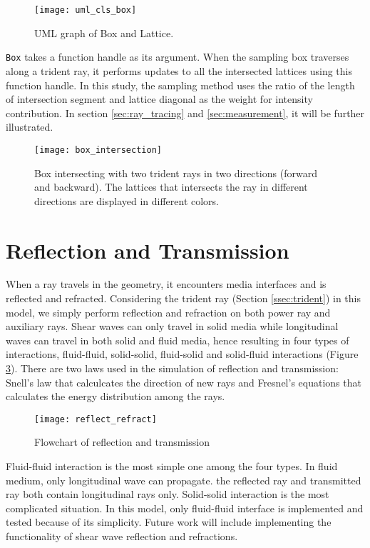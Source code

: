 \begin{figure}[h]
    \centering
    \texttt{[image: uml\_cls\_box]}
    \caption{UML graph of Box and Lattice.}
    \label{fig:uml_cls_box}
\end{figure}

\texttt{Box} takes a function handle as its argument. When the sampling box traverses along a trident ray,  it performs updates to all the intersected lattices using this function handle. In this study, the sampling method uses the ratio of the length of intersection segment and lattice diagonal as the weight for intensity contribution. In section \ref{sec:ray_tracing} and \ref{sec:measurement}, it will be further illustrated. 

\begin{figure}[h]
    \centering
    \texttt{[image: box\_intersection]}
    \caption{Box intersecting with two trident rays in two directions (forward and backward). The lattices that intersects the ray in different directions are displayed in different colors.}
    \label{fig:box_intersection}
\end{figure}

\section{Reflection and Transmission} \label{sec:rnr}

When a ray travels in the geometry, it encounters media interfaces and is reflected and refracted. Considering the trident ray (Section \ref{ssec:trident}) in this model, we simply perform reflection and refraction on both power ray and auxiliary rays. Shear waves can only travel in solid media while longitudinal waves can travel in both solid and fluid media, hence resulting in four types of interactions, fluid-fluid, solid-solid, fluid-solid and solid-fluid interactions (Figure \ref{fig:reflect_refract}). 
There are two laws used in the simulation of reflection and transmission: Snell's law that calculcates the direction of new rays and Fresnel's equations that calculates the energy distribution among the rays.

\begin{figure}[h]
    \centering
    \texttt{[image: reflect\_refract]}
    \caption{Flowchart of reflection and transmission}
    \label{fig:reflect_refract}
\end{figure}

Fluid-fluid interaction is the most simple one among the four types. In fluid medium, only longitudinal wave can propagate. the reflected ray and transmitted ray both contain longitudinal rays only. Solid-solid interaction is the most complicated situation. In this model, only fluid-fluid interface is implemented and tested because of its simplicity. Future work will include implementing the functionality of shear wave reflection and refractions.

